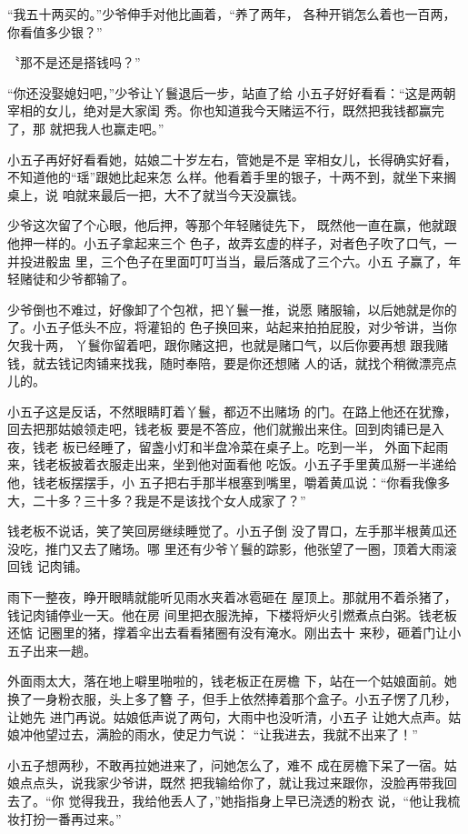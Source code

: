“我五十两买的。”少爷伸手对他比画着，“养了两年，
各种开销怎么着也一百两，你看值多少银？”

〝那不是还是搭钱吗？”

“你还没娶媳妇吧，”少爷让丫鬟退后一步，站直了给
小五子好好看看：“这是两朝宰相的女儿，绝对是大家闺
秀。你也知道我今天赌运不行，既然把我钱都赢完了，那
就把我人也赢走吧。”

小五子再好好看看她，姑娘二十岁左右，管她是不是
宰相女儿，长得确实好看，不知道他的“瑶”跟她比起来怎
么样。他看着手里的银子，十两不到，就坐下来搁桌上，说
咱就来最后一把，大不了就当今天没赢钱。

少爷这次留了个心眼，他后押，等那个年轻赌徒先下，
既然他一直在赢，他就跟他押一样的。小五子拿起来三个
色子，故弄玄虚的样子，对者色子吹了口气，一并投进骰盅
里，三个色子在里面叮叮当当，最后落成了三个六。小五
子赢了，年轻赌徒和少爷都输了。

少爷倒也不难过，好像卸了个包袱，把丫鬟一推，说愿
赌服输，以后她就是你的了。小五子低头不应，将灌铅的
色子换回来，站起来拍拍屁股，对少爷讲，当你欠我十两，
丫鬟你留着吧，跟你赌这把，也就是赌口气，以后你要再想
跟我赌钱，就去钱记肉铺来找我，随时奉陪，要是你还想赌
人的话，就找个稍微漂亮点儿的。

小五子这是反话，不然眼睛盯着丫鬟，都迈不出赌场
的门。在路上他还在犹豫，回去把那姑娘领走吧，钱老板
要是不答应，他们就搬出来住。回到肉铺已是入夜，钱老
板已经睡了，留盏小灯和半盘冷菜在桌子上。吃到一半，
外面下起雨来，钱老板披着衣服走出来，坐到他对面看他
吃饭。小五子手里黄瓜掰一半递给他，钱老板摆摆手，小
五子把右手那半根塞到嘴里，嚼着黄瓜说：“你看我像多
大，二十多？三十多？我是不是该找个女人成家了？”

钱老板不说话，笑了笑回房继续睡觉了。小五子倒
没了胃口，左手那半根黄瓜还没吃，推门又去了赌场。哪
里还有少爷丫鬟的踪影，他张望了一圈，顶着大雨滚回钱
记肉铺。

雨下一整夜，睁开眼睛就能听见雨水夹着冰雹砸在
屋顶上。那就用不着杀猪了，钱记肉铺停业一天。他在房
间里把衣服洗掉，下楼将炉火引燃煮点白粥。钱老板还惦
记圈里的猪，撑着伞出去看看猪圈有没有淹水。刚出去十
来秒，砸着门让小五子出来一趟。

外面雨太大，落在地上噼里啪啦的，钱老板正在房檐
下，站在一个姑娘面前。她换了一身粉衣服，头上多了簪
子，但手上依然捧着那个盒子。小五子愣了几秒，让她先
进门再说。姑娘低声说了两句，大雨中也没听清，小五子
让她大点声。姑娘冲他望过去，满脸的雨水，使足力气说：
“让我进去，我就不出来了！”

小五子想两秒，不敢再拉她进来了，问她怎么了，难不
成在房檐下呆了一宿。姑娘点点头，说我家少爷讲，既然
把我输给你了，就让我过来跟你，没脸再带我回去了。“你
觉得我丑，我给他丢人了，”她指指身上早已浇透的粉衣
说，“他让我梳妆打扮一番再过来。”

